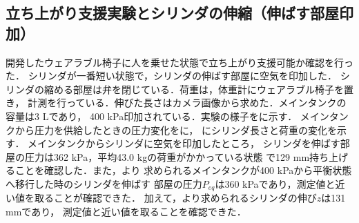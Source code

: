 \subsection{立ち上がり支援実験とシリンダの伸縮（伸ばす部屋印加）}
        開発したウェアラブル椅子に人を乗せた状態で立ち上がり支援可能か確認を行った．
        シリンダが一番短い状態で，シリンダの伸ばす部屋に空気を印加した．
        シリンダの縮める部屋は弁を閉じている．荷重は，体重計にウェアラブル椅子を置き，
        計測を行っている．伸びた長さはカメラ画像から求めた．メインタンクの容量は3 Lであり，
        400 kPa印加されている．実験の様子をに示す．
        メインタンクから圧力を供給したときの圧力変化をに，
        にシリンダ長さと荷重の変化を示す．
        メインタンクからシリンダに空気を印加したところ，
        シリンダを伸ばす部屋の圧力は362 kPa，平均43.0 kgの荷重がかかっている状態
        で129 mm持ち上げることを確認した．また，より
        求められるメインタンクが400 kPaから平衡状態へ移行した時のシリンダを伸ばす
        部屋の圧力$P_{eq}$は360 kPaであり，測定値と近い値を取ることが確認できた．
        加えて，より求められるシリンダの伸び$z$は131 mmであり，
        測定値と近い値を取ることを確認できた． 